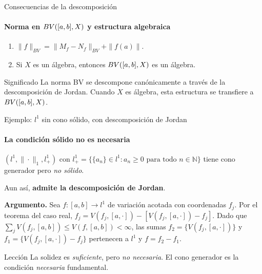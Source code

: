 
\begin{frame}{Consecuencias de la descomposición}
\framesubtitle{Norma en $BV([a,b],X)$ y estructura algebraica}

\begin{theorem}
\begin{enumerate}
    \item $\|f\|_{BV} = \|M_f-N_f\|_{BV} + \|f(a)\|$.
    \item Si $X$ es un álgebra, entonces $BV([a,b],X)$ es un álgebra.
\end{enumerate}
\end{theorem}

\medskip

\begin{alertblock}{Significado}
La norma BV se descompone canónicamente a través de la descomposición
de Jordan. Cuando $X$ es álgebra, esta estructura se transfiere a $BV([a,b],X)$.
\end{alertblock}


\end{frame}


\begin{frame}{Ejemplo: $l^1$ sin cono sólido, con descomposición de Jordan}
\framesubtitle{La condición sólido no es necesaria}

\begin{block}{}
$(l^1,\|\cdot\|_1,l^1_+)$ con
$l^1_+ = \bigl\{\{a_n\}\in l^1 : a_n\ge 0 \text{ para todo } n\in\mathbb{N}\bigr\}$
tiene cono generador pero \emph{no sólido}.

\smallskip
Aun así, \textbf{admite la descomposición de Jordan}.
\end{block}

{\small\textbf{Argumento.}
Sea $f:[a,b]\to l^1$ de variación acotada con coordenadas $f_j$.
Por el teorema del caso real, $f_j = V(f_j,[a,\cdot]) - [V(f_j,[a,\cdot])-f_j]$.
Dado que $\sum_j V(f_j,[a,b])\le V(f,[a,b])<\infty$,
las sumas $f_2=\{V(f_j,[a,\cdot])\}$ y $f_1=\{V(f_j,[a,\cdot])-f_j\}$
pertenecen a $l^1$ y $f = f_2 - f_1$.}

\medskip
\begin{alertblock}{Lección}
La solidez es \emph{suficiente}, pero \emph{no necesaria}.
El cono generador es la condición \emph{necesaria} fundamental.
\end{alertblock}

\end{frame}
